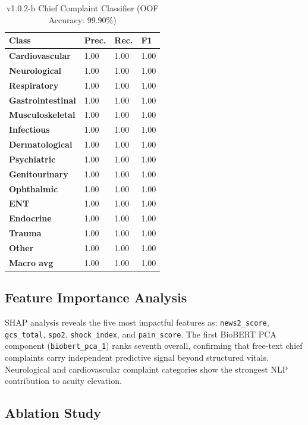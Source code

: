\documentclass[conference]{IEEEtran}
\begin{document}
\begin{table}[t]
\caption{v1.0.2-b Chief Complaint Classifier (OOF Accuracy: 99.90\%)}
\label{tab:v102b}
\renewcommand{\arraystretch}{1.2}
\begin{tabularx}{\columnwidth}{>{\bfseries}lXXX}
\toprule
Class & Prec. & Rec. & F1 \\
\midrule
Cardiovascular & 1.00 & 1.00 & 1.00 \\
Neurological & 1.00 & 1.00 & 1.00 \\
Respiratory & 1.00 & 1.00 & 1.00 \\
Gastrointestinal & 1.00 & 1.00 & 1.00 \\
Musculoskeletal & 1.00 & 1.00 & 1.00 \\
Infectious & 1.00 & 1.00 & 1.00 \\
Dermatological & 1.00 & 1.00 & 1.00 \\
Psychiatric & 1.00 & 1.00 & 1.00 \\
Genitourinary & 1.00 & 1.00 & 1.00 \\
Ophthalmic & 1.00 & 1.00 & 1.00 \\
ENT & 1.00 & 1.00 & 1.00 \\
Endocrine & 1.00 & 1.00 & 1.00 \\
Trauma & 1.00 & 1.00 & 1.00 \\
Other & 1.00 & 1.00 & 1.00 \\
\midrule
Macro avg & 1.00 & 1.00 & 1.00 \\
\bottomrule
\end{tabularx}
\end{table}

\subsection{Feature Importance Analysis}
SHAP analysis reveals the five most impactful features as: \texttt{news2\_score}, \texttt{gcs\_total}, \texttt{spo2}, \texttt{shock\_index}, and \texttt{pain\_score}. The first BioBERT PCA component (\texttt{biobert\_pca\_1}) ranks seventh overall, confirming that free-text chief complaints carry independent predictive signal beyond structured vitals. Neurological and cardiovascular complaint categories show the strongest NLP contribution to acuity elevation.

\subsection{Ablation Study}
\end{document}
